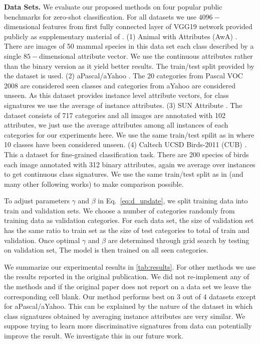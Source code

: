 \textbf{Data Sets.}
We evaluate our proposed methods on four popular public benchmarks for zero-shot classification.
For all datasets we use $4096-$dimensional features from first fully connected layer of VGG19 network \cite{vgg}
provided publicly as supplementary material of \cite{sse}.
(1) Animal with Attributes (AwA) \cite{lampert09}. There are images of 50 mammal species in this data set
each class described by a single $85-$dimensional attribute vector. We use the continuous attributes rather than
the binary version as it yield better results. The train/test split provided by the dataset is used.
(2) aPascal/aYahoo \cite{farhadi09}. The 20 categories from Pascal VOC 2008 \cite{pascal} are considered seen classes and
categories from aYahoo are considered unseen. As this dataset provides instance level attribute vectors,
for class signatures we use the average of instance attributes.
(3) SUN Attribute \cite{sun}. The dataset consists of 717 categories and all images are annotated with 102 attributes, we just
use the average attributes among all instances of each categories for our experiments here. We use the same train/test spilit
as in \cite{jayaraman14} where 10 classes have been considered unseen.
(4) Caltech UCSD Birds-2011 (CUB) \cite{cub}. This a dataset for fine-grained classification task. There are 200 species of
birds each image annotated with 312 binary attributes, again we average over instances to get continuous class signatures.
We use the same train/test split as in \cite{akata13} (and many other following works) to make comparison possible.

To adjust parameters $\gamma$ and $\beta$ in Eq.~\ref{eq:d_update}, we split training data into train and validation sets.
We choose a number of categories randomly from training data as validation categories. For each data set, the size of
validation set has the same ratio to train set as the size of test categories to total of train and validation.
Once optimal $\gamma$ and $\beta$ are determined through grid search by testing on validation set, The model
is then trained on all seen categories.

We summarize our experimental results in \ref{tab:results}. For other methods we use the results reported in the original publication.
We did not re-implement any of the methods and if the original paper does not report on a data set we leave the corresponding cell blank.
Our method performs best on 3 out of 4 datasets except for aPascal/aYahoo. This can be explained by the nature of the dataset
in which class signatures obtained by averaging instance attributes are very similar. We suppose trying to learn
more discriminative signatures from data can potentially improve the result. We investigate this in our future work.

